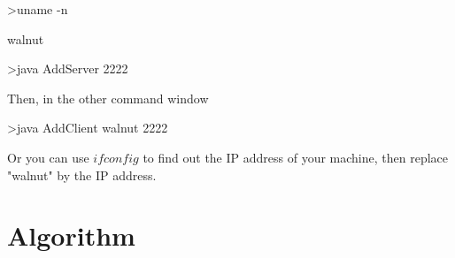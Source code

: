 \documentclass{article}
\begin{document}
>uname -n

walnut

>java AddServer 2222

Then, in the other command window

>java AddClient walnut 2222

Or you can use $ifconfig$ to find out the IP address of your machine, then replace "walnut" by the IP address.



\section{Algorithm}
\end{document}
